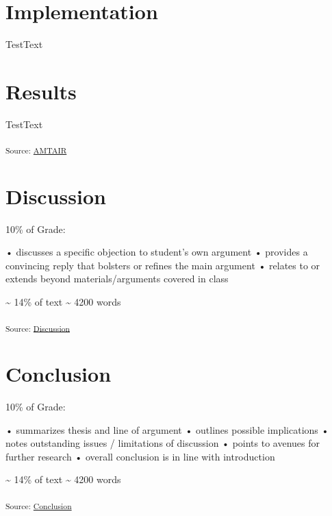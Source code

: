 \documentclass[11pt,a4paper]{report}
\begin{document}
\section{Implementation}\label{implementation}

TestText

\section{}\label{section-5}

\section{Results}\label{results}

TestText

\textsubscript{Source:
\href{https://VJMeyer.github.io/submission/chapters/AMTAIR-preview.html\#149ee311-cb07-44f6-960f-4726d869cf4d}{AMTAIR}}

\section{Discussion}\label{discussion}

10\% of Grade:

• discusses a specific objection to student's own argument • provides a
convincing reply that bolsters or refines the main argument • relates to
or extends beyond materials/arguments covered in class

\textasciitilde{} 14\% of text \textasciitilde{} 4200 words

\textsubscript{Source:
\href{https://VJMeyer.github.io/submission/chapters/Discussion-preview.html\#69524e2c-0cdc-4157-b3de-1c540e6d68cd}{Discussion}}

\section{Conclusion}\label{conclusion}

10\% of Grade:

• summarizes thesis and line of argument • outlines possible
implications • notes outstanding issues / limitations of discussion •
points to avenues for further research • overall conclusion is in line
with introduction

\textasciitilde{} 14\% of text \textasciitilde{} 4200 words

\textsubscript{Source:
\href{https://VJMeyer.github.io/submission/chapters/Conclusion-preview.html\#16bd5b2f-c18e-4ac3-be9f-823d9f0c5aea}{Conclusion}}
\end{document}
